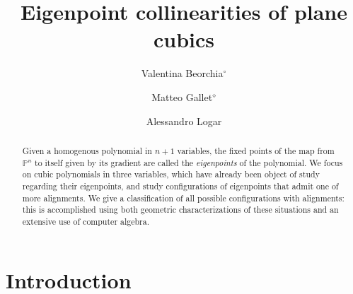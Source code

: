 \documentclass[11pt, a4paper, reqno, captions=tableheading,bibliography=totoc]{scrartcl}
\title{Eigenpoint collinearities of plane cubics}
\author{Valentina Beorchia$^{\circ}$ \and Matteo Gallet$^{\diamond}$ \and Alessandro Logar}
\date{}
\theoremstyle{plain}
\theoremstyle{definition}
\newcommand{\p}{\mathbb{P}}
\begin{document}
\maketitle
{}

\begin{abstract}
 Given a homogenous polynomial in $n+1$ variables, the fixed points of the map from $\p^n$ to itself given by its gradient are called the \emph{eigenpoints} of the polynomial. We focus on cubic polynomials in three variables, which have already been object of study regarding their eigenpoints, and study configurations of eigenpoints that admit one of more alignments. We give a classification of all possible configurations with alignments: this is accomplished using both geometric characterizations of these situations and an extensive use of computer algebra.
\end{abstract}

\section{Introduction}
\end{document}
